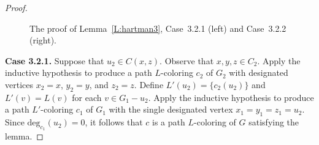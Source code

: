 \documentclass[12pt,letterpaper]{article}
\theoremstyle{plain}
\theoremstyle{definition}
\theoremstyle{break}
\begin{document}
\begin{proof}
\begin{figure}[ht]
\begin{center}
\caption{The proof of Lemma~\ref{L:hartman3}, Case~3.2.1 (left) and
Case~3.2.2 (right).}
\end{center}
\end{figure}

\textbf{Case 3.2.1.}
Suppose that $u_2\in C(x,z)$. Observe that $x,y,z\in C_2$.
Apply the inductive hypothesis to produce a path $L$-coloring
$c_2$ of $G_2$ with designated
vertices $x_2=x$, $y_2=y$, and $z_2=z$.
Define $L'(u_2)=\{c_2(u_2)\}$ and $L'(v)=L(v)$ for each
$v\in G_1-u_2$. Apply the inductive hypothesis to produce a path $L'$-coloring
$c_1$ of $G_1$ with the single designated vertex $x_1=y_1=z_1=u_2$. Since 
$\text{deg}_{c_1}(u_2)=0$, it follows that $c$ is a path $L$-coloring of $G$
satisfying the lemma.


\end{proof}
\end{document}
